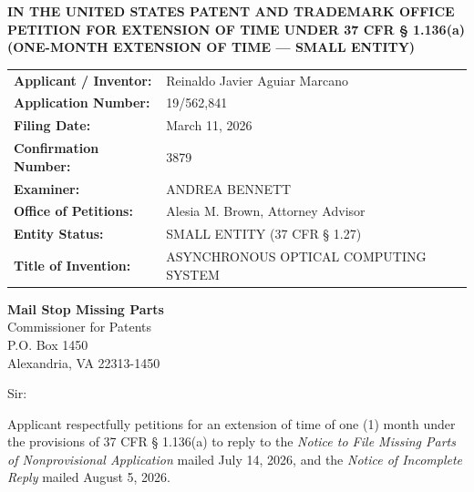 \documentclass[11pt,letterpaper]{article}
\begin{document}
\thispagestyle{empty}

\begin{center}
    \textbf{\large IN THE UNITED STATES PATENT AND TRADEMARK OFFICE} \\
    \vspace{0.3cm}
    \textbf{\large PETITION FOR EXTENSION OF TIME UNDER 37 CFR \S{} 1.136(a)} \\
    \textbf{\normalsize (ONE-MONTH EXTENSION OF TIME --- SMALL ENTITY)}
\end{center}

\vspace{0.4cm}
\noindent\begin{tabular}{p{2.3in}p{4.0in}}
\textbf{Applicant / Inventor:} & Reinaldo Javier Aguiar Marcano \\
\textbf{Application Number:} & 19/562,841 \\
\textbf{Filing Date:} & March 11, 2026 \\
\textbf{Confirmation Number:} & 3879 \\
\textbf{Examiner:} & ANDREA BENNETT \\
\textbf{Office of Petitions:} & Alesia M. Brown, Attorney Advisor \\
\textbf{Entity Status:} & SMALL ENTITY (37 CFR \S{} 1.27) \\
\textbf{Title of Invention:} & ASYNCHRONOUS OPTICAL COMPUTING SYSTEM \\
\end{tabular}

\vspace{0.5cm}
\noindent\textbf{Mail Stop Missing Parts} \\
Commissioner for Patents \\
P.O. Box 1450 \\
Alexandria, VA 22313-1450

\vspace{0.2cm}
Sir:

Applicant respectfully petitions for an extension of time of one (1) month under the provisions of 37 CFR \S{} 1.136(a) to reply to the \textit{Notice to File Missing Parts of Nonprovisional Application} mailed July 14, 2026, and the \textit{Notice of Incomplete Reply} mailed August 5, 2026.
\end{document}
